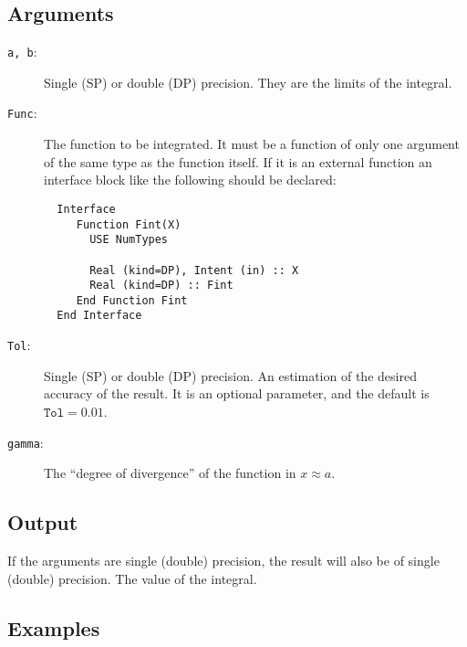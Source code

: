 \subsection{Arguments}

\begin{description}
\item[\texttt{a, b}:] Single (SP) or double (DP) precision. They are
  the limits of the integral.
\item[\texttt{Func}:] The function to be integrated. It must be a
  function of only one argument of the same type as the function
  itself. If it is an
  external function an interface block like the following should be
  declared: 
\begin{verbatim}
  Interface 
     Function Fint(X)
       USE NumTypes

       Real (kind=DP), Intent (in) :: X
       Real (kind=DP) :: Fint
     End Function Fint
  End Interface
\end{verbatim}
\item[\texttt{Tol}:] Single (SP) or double (DP) precision. An
  estimation of the desired accuracy of the result. It is an optional
  parameter, and the default is $\mathtt{Tol} = 0.01$. 
\item[\texttt{gamma}:] The ``degree of divergence'' of the function in
  $x\approx a$. 
\end{description}


\subsection{Output}

If the arguments are single (double) precision, the result will also be of
single (double) precision. The value of the integral.


\subsection{Examples}

